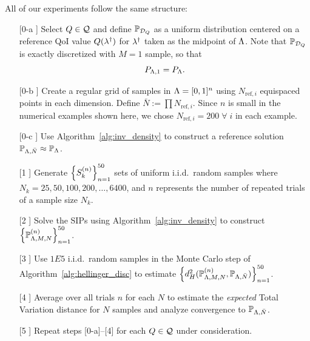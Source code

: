 All of our experiments follow the same structure:
\begin{itemize}
\item[[0-a]] Select $Q\in\mathcal{Q}$ and define $\mathbb{P}_{\mathcal{D}_Q}$ as a uniform distribution centered on a reference QoI value $Q(\lambda^\dagger)$ for $\lambda^\dagger$ taken as the midpoint of ${\Lambda}$.
Note that $\mathbb{P}_{\mathcal{D}_Q}$ is exactly discretized with $M=1$ sample, so that
\[
P_{{\Lambda}, 1} = P_{\Lambda}.
\]
\item[[0-b]] Create a regular grid of samples in ${\Lambda}=[0,1]^n$ using $N_{\text{ref},i}$ equispaced points in each dimension.
Define $\bar{N} := \prod N_{\text{ref},i}$.
Since $n$ is small in the numerical examples shown here, we chose $N_{\text{ref},i} = 200 \; \forall \; i$ in each example.
\item[[0-c]] Use Algorithm~\ref{alg:inv_density} to construct a reference solution $\mathbb{P}_{{\Lambda},\bar{N}}\approx \mathbb{P}_{\Lambda}$.
\item[[1]] Generate $\left\{S_k^{(n)}\right\}_{n=1}^{50}$ sets of uniform i.i.d.~random samples where $N_k = 25, 50, 100, 200, \hdots, 6400$, and $n$ represents the number of repeated trials of a sample size $N_k$.
\item[[2]] Solve the SIPs using Algorithm~\ref{alg:inv_density} to construct $\left\{\mathbb{P}_{{\Lambda},M,N}^{(n)}\right\}_{n=1}^{50}$.
\item[[3]] Use $1E5$ i.i.d.~random samples in the Monte Carlo step of Algorithm~\ref{alg:hellinger_disc} to estimate $\left\{d_H^2( \mathbb{P}_{{\Lambda},M,N}^{(n)}, \mathbb{P}_{{\Lambda},\bar{N}})\right\}_{n=1}^{50}$.
\item[[4]] Average over all trials $n$ for each $N$ to estimate the {\em expected} Total Variation distance for $N$ samples and analyze convergence to $\mathbb{P}_{{\Lambda},\bar{N}}$.
\item[[5]] Repeat steps [0-a]--[4] for each $Q\in\mathcal{Q}$ under consideration.
\end{itemize}

\FloatBarrier

